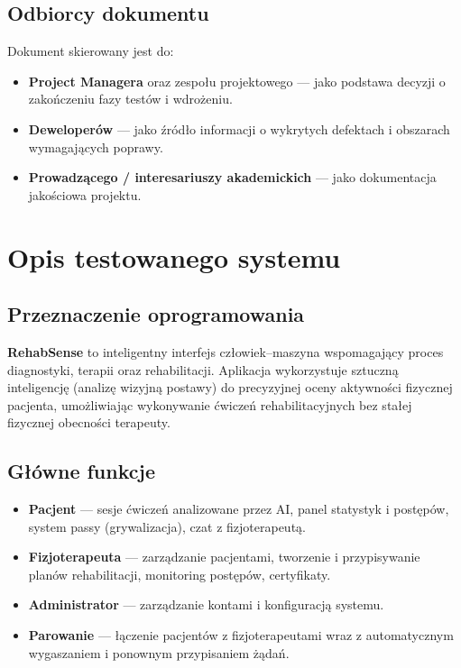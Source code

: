 \documentclass[11pt,a4paper]{article}
\newcommand{\sysname}{\textbf{RehabSense}}
\begin{document}
\subsection{Odbiorcy dokumentu}
Dokument skierowany jest do:
\begin{itemize}
  \item \textbf{Project Managera} oraz zespołu projektowego — jako podstawa decyzji o zakończeniu fazy testów i wdrożeniu.
  \item \textbf{Deweloperów} — jako źródło informacji o wykrytych defektach i obszarach wymagających poprawy.
  \item \textbf{Prowadzącego / interesariuszy akademickich} — jako dokumentacja jakościowa projektu.
\end{itemize}

\section{Opis testowanego systemu}

\subsection{Przeznaczenie oprogramowania}
\sysname{} to inteligentny interfejs człowiek–maszyna wspomagający proces diagnostyki, terapii oraz rehabilitacji. Aplikacja wykorzystuje sztuczną inteligencję (analizę wizyjną postawy) do precyzyjnej oceny aktywności fizycznej pacjenta, umożliwiając wykonywanie ćwiczeń rehabilitacyjnych bez stałej fizycznej obecności terapeuty.

\subsection{Główne funkcje}
\begin{itemize}
  \item \textbf{Pacjent} — sesje ćwiczeń analizowane przez AI, panel statystyk i postępów, system passy (grywalizacja), czat z fizjoterapeutą.
  \item \textbf{Fizjoterapeuta} — zarządzanie pacjentami, tworzenie i przypisywanie planów rehabilitacji, monitoring postępów, certyfikaty.
  \item \textbf{Administrator} — zarządzanie kontami i konfiguracją systemu.
  \item \textbf{Parowanie} — łączenie pacjentów z fizjoterapeutami wraz z automatycznym wygaszaniem i ponownym przypisaniem żądań.
\end{itemize}
\end{document}
